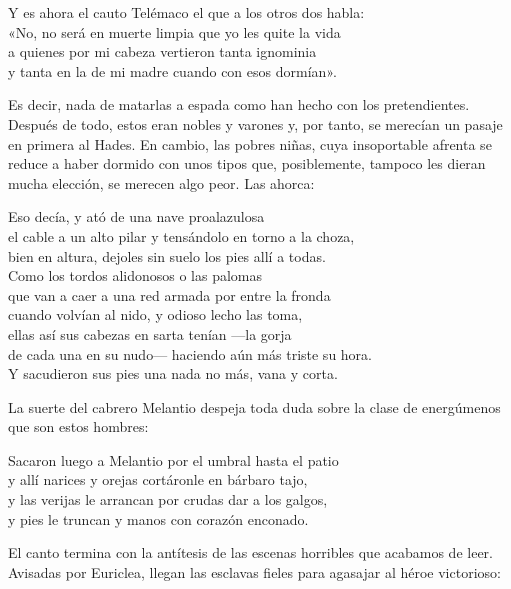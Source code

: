 \begin{versocita}
Y es ahora el cauto Telémaco el que a los otros dos habla:\\
«No, no será en muerte limpia que yo les quite la vida\\
a quienes por mi cabeza vertieron tanta ignominia\\
y tanta en la de mi madre cuando con esos dormían».
\end{versocita}

Es decir, nada de matarlas a espada como han hecho con los pretendientes. Después de todo, estos eran nobles y varones y, por tanto, se merecían un pasaje en primera al Hades. En cambio, las pobres niñas, cuya insoportable afrenta se reduce a haber dormido con unos tipos que, posiblemente, tampoco les dieran mucha elección, se merecen algo peor. Las ahorca:

\begin{versocita}
Eso decía, y ató de una nave proalazulosa\\
el cable a un alto pilar y tensándolo en torno a la choza,\\
bien en altura, dejoles sin suelo los pies allí a todas.\\
Como los tordos alidonosos o las palomas\\
que van a caer a una red armada por entre la fronda\\
cuando volvían al nido, y odioso lecho las toma,\\
ellas así sus cabezas en sarta tenían ---la gorja\\
de cada una en su nudo--- haciendo aún más triste su hora.\\
Y sacudieron sus pies una nada no más, vana y corta.
\end{versocita}

La suerte del cabrero Melantio despeja toda duda sobre la clase de energúmenos que son estos hombres:

\begin{versocita}
Sacaron luego a Melantio por el umbral hasta el patio\\
y allí narices y orejas cortáronle en bárbaro tajo,\\
y las verijas le arrancan por crudas dar a los galgos,\\
y pies le truncan y manos con corazón enconado.
\end{versocita}

El canto termina con la antítesis de las escenas horribles que acabamos de leer. Avisadas por Euriclea, llegan las esclavas fieles para agasajar al héroe victorioso:

